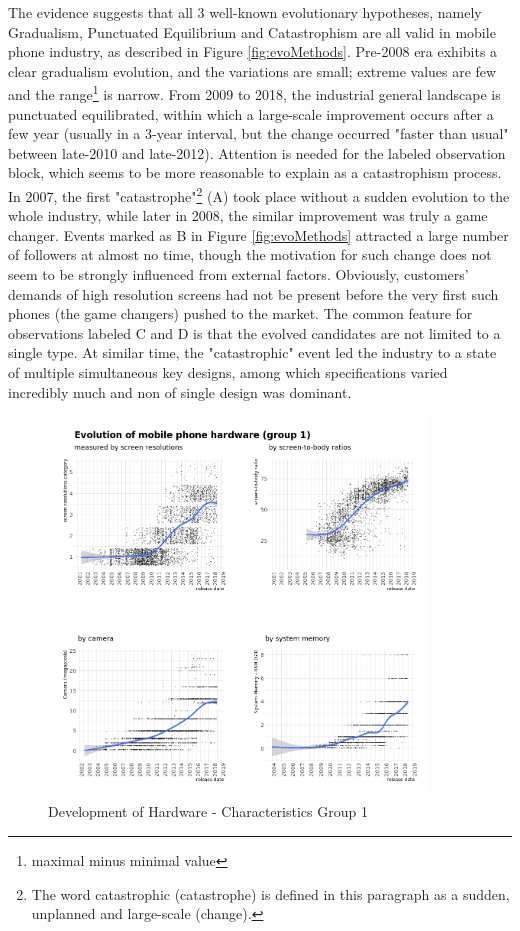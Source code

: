 \documentclass[utf8,english]{gradu3}
\begin{document}
The evidence suggests that all 3 well-known evolutionary hypotheses, namely Gradualism, Punctuated Equilibrium and Catastrophism are all valid in mobile phone industry, as described in Figure \ref{fig:evoMethods}. Pre-2008 era exhibits a clear gradualism evolution, and the variations are small; extreme values are few and the range\footnote{maximal minus minimal value} is narrow. From 2009 to 2018, the industrial general landscape is punctuated equilibrated, within which a large-scale improvement occurs after a few year (usually in a 3-year interval, but the change occurred "faster than usual" between late-2010 and late-2012). Attention is needed for the labeled observation block, which seems to be more reasonable to explain as a catastrophism process. In 2007, the first "catastrophe"\footnote{The word catastrophic (catastrophe) is defined in this paragraph as a sudden, unplanned and large-scale (change).} (A) took place without a sudden evolution to the whole industry, while later in 2008, the similar improvement was truly a game changer. Events marked as B in Figure \ref{fig:evoMethods} attracted a large number of followers at almost no time, though the motivation for such change does not seem to be strongly influenced from external factors. Obviously, customers' demands of high resolution screens had not be present before the very first such phones (the game changers) pushed to the market. The common feature for observations labeled C and D is that the evolved candidates are not limited to a single type. At similar time, the "catastrophic" event led the industry to a state of multiple simultaneous key designs, among which specifications varied incredibly much and non of single design was dominant. 

\begin{figure}[htb]
    \centering
    \includegraphics[width=0.90\textwidth]{evo1.png}
    \caption{Development of Hardware - Characteristics Group 1}
    \label{fig:screen resolutions}
\end{figure}
\end{document}

